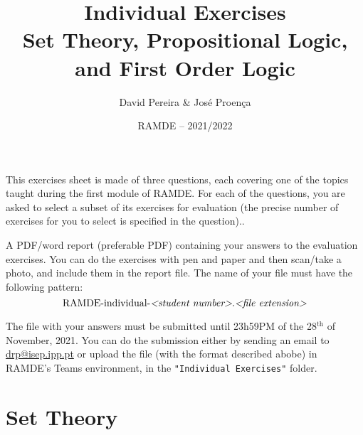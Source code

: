 \documentclass[11pt]{article}
\date{RAMDE -- 2021/2022}
\newcommand{\descrbox}[2]{
\begin{tcolorbox}[fonttitle=\sffamily\bfseries\Large\center, title=#1]
  {#2}
\end{tcolorbox}
}
\begin{document}
 
 
\title{Individual Exercises\\ Set Theory, Propositional Logic, and First Order Logic}%

\author{David Pereira \& Jos\'{e} Proen\c{c}a} 


\maketitle

\vspace*{-5mm}

\descrbox{Rationale}{
This exercises sheet is made of three questions, each covering one of the topics taught during the first module of RAMDE. For each of the questions, you are asked to select a subset of its exercises for evaluation (the precise number of exercises for you to select is specified in the question)..
}


\descrbox{What to Submit}{A PDF/word report (preferable PDF) containing your answers to the evaluation exercises. You can do the exercises with pen and paper and then scan/take a photo, and include them in the report file. The name of your file must have the following pattern: $$\text{RAMDE-individual-\textit{<student number>}.\textit{<file extension>}}$$}


\descrbox{Deadline of Submission}{The file with your answers must be submitted until 23h59PM of the 28$^\text{th}$ of November, 2021. You can do the submission either by sending an email to \url{drp@isep.ipp.pt} or upload the file (with the format described abobe) in RAMDE's Teams environment, in the {\tt "Individual Exercises"} folder.

}



\section{Set Theory}
\end{document}
